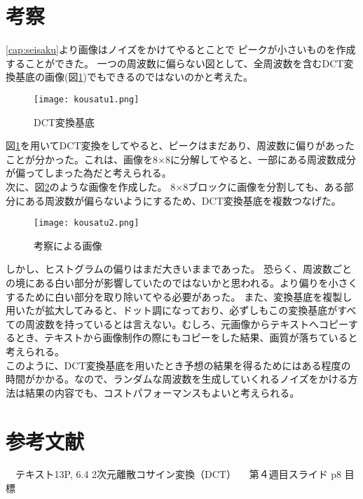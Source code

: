 \documentclass[a4j]{jsarticle}
\begin{document}
\section{考察}
\ref{cap:seisaku}より画像はノイズをかけてやるとことで
ピークが小さいものを作成することができた。
一つの周波数に偏らない図として、全周波数を含むDCT変換基底の画像(図\ref{pic:kousatu1})でもできるのではないのかと考えた。
\begin{figure}[H]
  \centering
  \texttt{[image: kousatu1.png]}
  \caption{DCT変換基底}
  \label{pic:kousatu1}
\end{figure}
図\ref{pic:kousatu1}を用いてDCT変換をしてやると、ピークはまだあり、周波数に偏りがあったことが分かった。これは、画像を8×8に分解してやると、一部にある周波数成分が偏ってしまった為だと考えられる。\\
次に、図\ref{pic:kousatu2}のような画像を作成した。
8×8ブロックに画像を分割しても、ある部分にある周波数が偏らないようにするため、DCT変換基底を複数つなげた。
\begin{figure}[H]
  \centering
  \texttt{[image: kousatu2.png]}
  \caption{考察による画像}
  \label{pic:kousatu2}
\end{figure}
しかし、ヒストグラムの偏りはまだ大きいままであった。
恐らく、周波数ごとの境にある白い部分が影響していたのではないかと思われる。より偏りを小さくするために白い部分を取り除いてやる必要があった。
また、変換基底を複製し用いたが拡大してみると、ドット調になっており、必ずしもこの変換基底がすべての周波数を持っているとは言えない。むしろ、元画像からテキストへコピーするとき、テキストから画像制作の際にもコピーをした結果、画質が落ちていると考えられる。\\
このように、DCT変換基底を用いたとき予想の結果を得るためにはある程度の時間がかかる。なので、ランダムな周波数を生成していくれるノイズをかける方法は結果の内容でも、コストパフォーマンスもよいと考えられる。

\section{参考文献}
\begin{thebibliography}{99}
  　テキスト13P, 6.4 2次元離散コサイン変換（DCT）
  　第４週目スライド p8 目標

\end{thebibliography}
\end{document}
